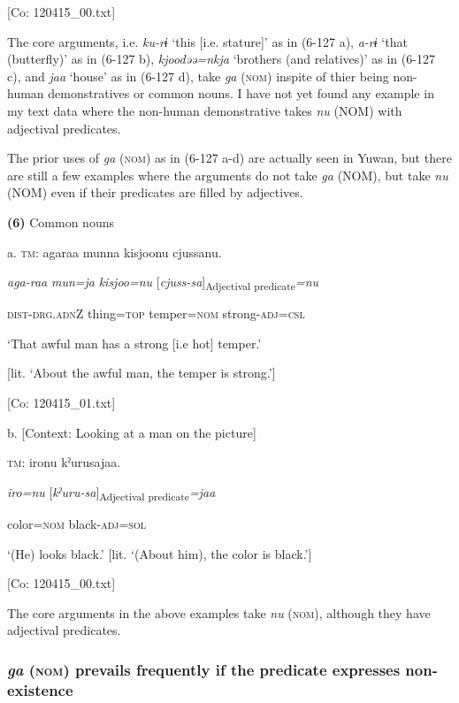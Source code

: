       [Co: 120415\_00.txt]

The core arguments, i.e. \textit{ku-rɨ} ‘this [i.e. stature]’ as in (6-127 a), \textit{a-rɨ} ‘that (butterfly)’ as in (6-127 b), \textit{kjoodəə=nkja} ‘brothers (and relatives)’ as in (6-127 c), and \textit{jaa} ‘house’ as in (6-127 d), take \textit{ga} (\textsc{nom}) inspite of thier being non-human demonstratives or common nouns. I have not yet found any example in my text data where the non-human demonstrative takes \textit{nu} (NOM) with adjectival predicates.

The prior uses of \textit{ga} (\textsc{nom}) as in (6-127 a-d) are actually seen in Yuwan, but there are still a few examples where the arguments do not take \textit{ga} (NOM), but take \textit{nu} (NOM) even if their predicates are filled by adjectives.

\textbf{(6)}  Common nouns

  a.  \textsc{tm}:  agaraa  munna  kisjoonu  cjussanu.

      \textit{aga-raa}  \textit{mun=ja}  \textit{kisjoo=nu}  [\textit{cjuss-sa}]\textsubscript{Adjectival predicate}\textit{=nu}

      \textsc{dist}-\textsc{drg}.\textsc{adn}Z  thing=\textsc{top}  temper=\textsc{nom}  strong-\textsc{adj}=\textsc{csl}

      ‘That awful man has a strong [i.e hot] temper.’

[lit. ‘About the awful man, the temper is strong.’]

      [Co: 120415\_01.txt]

  b.  [Context: Looking at a man on the picture]

    \textsc{tm}:  {\textbar}iro{\textbar}nu  kˀurusajaa.

      \textit{iro=nu}  [\textit{kˀuru-sa}]\textsubscript{Adjectival predicate}\textit{=jaa}

      color=\textsc{nom}  black-\textsc{adj}=\textsc{sol}

      ‘(He) looks black.’ [lit. ‘(About him), the color is black.’]

      [Co: 120415\_00.txt]

The core arguments in the above examples take \textit{nu} (\textsc{nom}), although they have adjectival predicates.

\subsubsection{\textit{ga} (\textsc{nom}) prevails frequently if the predicate expresses non-existence}

